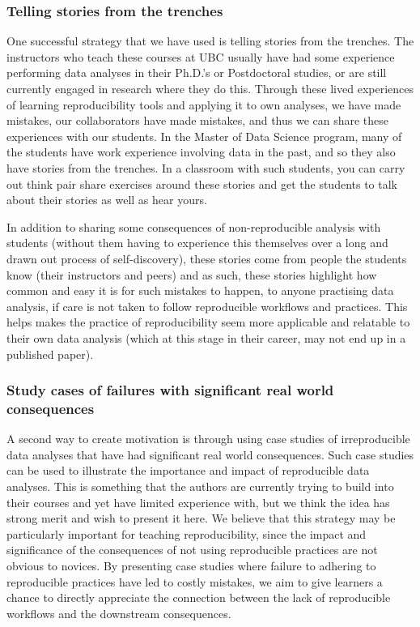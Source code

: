\documentclass[
  12 pt,
]{paper}
\begin{document}
\hypertarget{telling-stories-from-the-trenches}{%
\subsubsection{Telling stories from the trenches}\label{telling-stories-from-the-trenches}}

One successful strategy that we have used is telling stories from the trenches.
The instructors who teach these courses at UBC usually have had some experience
performing data analyses in their Ph.D.'s or Postdoctoral studies,
or are still currently engaged in research where they do this.
Through these lived experiences
of learning reproducibility tools
and applying it to own analyses, we have made mistakes,
our collaborators have made mistakes,
and thus we can share these experiences with our students.
In the Master of Data Science program,
many of the students have work experience involving data in the past,
and so they also have stories from the trenches.
In a classroom with such students,
you can carry out think pair share exercises around these stories
and get the students to talk about their stories as well as hear yours.

In addition to sharing some consequences of non-reproducible analysis
with students (without them having to experience this themselves
over a long and drawn out process of self-discovery),
these stories come from people the students know
(their instructors and peers) and as such,
these stories highlight how common and easy it is for such mistakes to happen,
to anyone practising data analysis,
if care is not taken to follow reproducible workflows and practices.
This helps makes the practice of reproducibility seem more applicable
and relatable to their own data analysis
(which at this stage in their career, may not end up in a published paper).

\hypertarget{study-cases-of-failures-with-significant-real-world-consequences}{%
\subsubsection{Study cases of failures with significant real world consequences}\label{study-cases-of-failures-with-significant-real-world-consequences}}

A second way to create motivation
is through using case studies of irreproducible data analyses
that have had significant real world consequences.
Such case studies can be used to illustrate the importance
and impact of reproducible data analyses.
This is something that the authors
are currently trying to build into their courses
and yet have limited experience with,
but we think the idea has strong merit and wish to present it here.
We believe that this strategy
may be particularly important for teaching reproducibility,
since the impact and significance of the consequences
of not using reproducible practices are not obvious to novices.
By presenting case studies
where failure to adhering to reproducible practices
have led to costly mistakes,
we aim to give learners a chance to directly appreciate
the connection between the lack of reproducible workflows
and the downstream consequences.
\end{document}
